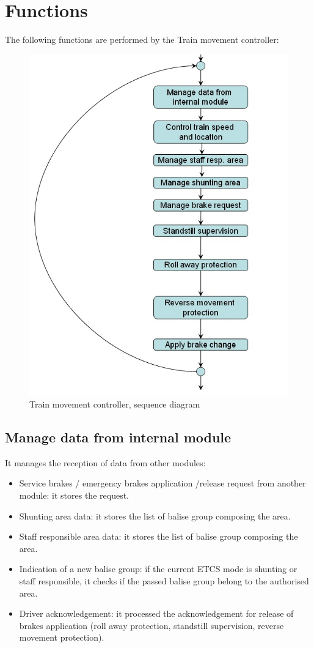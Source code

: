 \documentclass[nocc]{template/openetcs_report}
\begin{document}
\section{Functions}
The following functions are performed by the Train movement controller:
\begin{figure}[!h]
  \centering
  \includegraphics[width=\textwidth]{image/evc_train_mvmt_controller}
  \caption{Train movement controller, sequence diagram}
  \label{fig:Train movement controller, sequence diagram}
\end{figure}
\subsection{Manage data from internal module}
It manages the reception of data from other modules:
\begin{itemize}
\item Service brakes / emergency brakes application /release request from another module: it stores the request.
\item Shunting area data: it stores the list of balise group composing the area.
\item Staff responsible area data: it stores the list of balise group composing the area.
\item Indication of a new balise group: if the current ETCS mode is shunting or staff responsible, it checks if the passed balise group belong to the authorised area.
\item Driver acknowledgement: it processed the acknowledgement for release of brakes application (roll away protection, standstill supervision, reverse movement protection).
\end{itemize}
\end{document}
